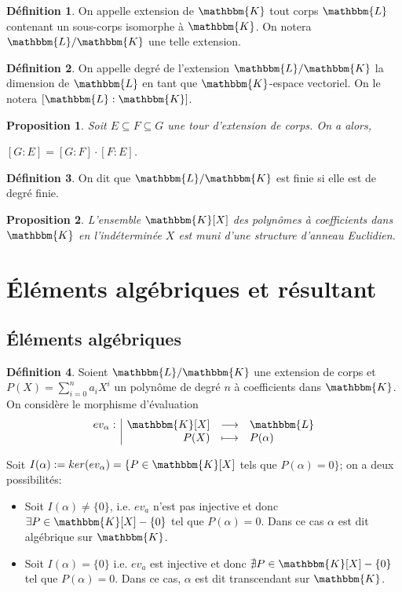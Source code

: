 \documentclass[12pt]{article}
\newcommand{\jL}{\mathbbm{L}}
\newcommand{\K}{\mathbbm{K}}
\newcommand{\fonction}[5]{
\begin{displaymath}
\begin{array}{l|rcl}
\displaystyle
#1 : & #2 & \longrightarrow & #3 \\
    & #4 & \longmapsto & #5
\end{array}
\end{displaymath}
}
\newtheorem{prop}{Proposition}
\theoremstyle{definition}\newtheorem{defn}{Définition}
\theoremstyle{definition}\newtheorem{exm}{Exemple}
\theoremstyle{definition}\newtheorem{rem}{Remarque}
\theoremstyle{definition}\newtheorem{algo}{Algorithme}
\theoremstyle{remark}\newtheorem{exo}{Exercice}
\theoremstyle{remark}\newtheorem{nota}{Notation}
\begin{document}
\begin{defn}
On appelle extension de $\K$ tout corps $\jL$ contenant un sous-corps isomorphe à $\K$. On notera $\jL / \K$ une telle extension.
\end{defn}

\begin{defn}
On appelle degré de l'extension $\jL / \K$ la dimension de $\jL$ en tant que $\K$-espace vectoriel. On le notera $[\jL : \K]$.
\end{defn}

\begin{prop}
Soit $E \subseteq F \subseteq G$ une tour d'extension de corps. On a alors, 
\begin{center}
$[G : E] = [G : F] \cdot [F : E]$.
\end{center}
\end{prop}

\begin{defn}
On dit que $\jL / \K$ est finie si elle est de degré finie.
\end{defn}

\begin{prop}
L'ensemble $\K[X]$ des polynômes à coefficients dans $\K$ en l'indéterminée $X$ est muni d'une structure d'anneau Euclidien.
\end{prop}


\section{Éléments algébriques et résultant}
\subsection{Éléments algébriques}
\begin{defn}
Soient $\jL/\K$ une extension de corps et $P(X) = \sum_{i=0}^{n}a_iX^i$ un polynôme de degré $n$ à coefficients dans $\K$. On considère le morphisme d'évaluation \fonction{ev_\alpha}{\K[X]}{\jL}{P(X)}{P(\alpha)}
Soit $I(\alpha) :=  ker(ev_\alpha) = \{ P \in \K[X]$ tels que $P(\alpha) = 0\}$; on a deux possibilités:

\begin{itemize}
	\item Soit $I(\alpha) \ne \{ 0 \}$, i.e. $ev_a$ n'est pas injective et donc $\exists P \in \K[X] - \{0\}$ tel que $P(\alpha) = 0$. \newline
Dans ce cas $\alpha$ est dit algébrique sur $\K$.
	\item Soit $I(\alpha) = \{ 0 \}$ i.e. $ev_a$ est injective et donc $\nexists P \in \K[X] - \{0\}$ tel que $P(\alpha) = 0$. \newline
Dans ce cas, $\alpha$ est dit transcendant sur $\K$.
\end{itemize}
\end{defn}
\end{document}
